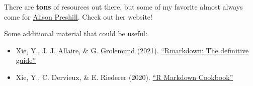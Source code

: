 \documentclass[
]{article}
\begin{document}
There are \textbf{tons} of resources out there, but some of my favorite
almost always come for \href{https://twitter.com/apreshill}{Alison
Preshill}. Check out her website!

Some additional material that could be useful:

\begin{itemize}
\item
  Xie, Y., J. J. Allaire, \& G. Grolemund (2021).
  \href{https://bookdown.org/yihui/rmarkdown/}{``Rmarkdown: The
  definitive guide''}
\item
  Xie, Y., C. Dervieux, \& E. Riederer (2020).
  \href{https://bookdown.org/yihui/rmarkdown-cookbook/}{``R Markdown
  Cookbook''}
\end{itemize}
\end{document}
